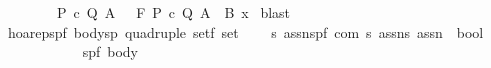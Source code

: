 \begin{isabellebody}
\ \ \ \ \ \ \ \ {\isacharparenleft}{\isasymlambda}{\isacharparenleft}P{\isacharcomma}\ c{\isacharcomma}\ Q{\isacharcomma}\ A{\isacharprime}{\isacharparenright}{\isachardot}\ {\isacharparenleft}{\isasymGamma}{\isacharcomma}\ {\isasymTheta}{\isacharcomma}\ F{\isacharcomma}\ P{\isacharcomma}\ c{\isacharcomma}\ Q{\isacharcomma}\ A{\isacharprime}{\isacharparenright}\ {\isasymin}\ B{\isacharparenright}\ x{\isachardoublequoteclose}\isanewline
%
\isadelimproof
%
\endisadelimproof
%
\isatagproof
{}\isamarkupfalse%
\ blast\isanewline
{}\isamarkupfalse%
%
\endisatagproof
{\isafoldproof}%
%
\isadelimproof
\isanewline
%
\endisadelimproof
\isanewline
\isanewline
{}\isamarkupfalse%
\ {\isachardoublequoteopen}hoarep{\isachardoublequoteclose}{\isacharcolon}{\isacharcolon}{\isachardoublequoteopen}{\isacharbrackleft}{\isacharparenleft}{\isacharprime}s{\isacharcomma}{\isacharprime}p{\isacharcomma}{\isacharprime}f{\isacharparenright}\ body{\isacharcomma}{\isacharparenleft}{\isacharprime}s{\isacharcomma}{\isacharprime}p{\isacharparenright}\ quadruple\ set{\isacharcomma}{\isacharprime}f\ set{\isacharcomma}\isanewline
\ \ \ \ {\isacharprime}s\ assn{\isacharcomma}{\isacharparenleft}{\isacharprime}s{\isacharcomma}{\isacharprime}p{\isacharcomma}{\isacharprime}f{\isacharparenright}\ com{\isacharcomma}\ {\isacharprime}s\ assn{\isacharcomma}{\isacharprime}s\ assn{\isacharbrackright}\ {\isacharequal}{\isachargreater}\ bool{\isachardoublequoteclose}\isanewline
\ \ \ \ {\isacharparenleft}{\isachardoublequoteopen}{\isacharparenleft}{}{\isacharunderscore}{\isacharcomma}{\isacharunderscore}{\isacharslash}{\isasymturnstile}\isactrlbsub {\isacharprime}{\isacharslash}{\isacharunderscore}\ \isactrlesub {\isacharparenleft}{\isacharunderscore}{\isacharslash}\ {\isacharparenleft}{\isacharunderscore}{\isacharparenright}{\isacharslash}\ {\isacharunderscore}{\isacharcomma}{\isacharslash}{\isacharunderscore}{\isacharparenright}{\isacharparenright}{\isachardoublequoteclose}\ {\isacharbrackleft}{}{}{\isacharcomma}{}{}{\isacharcomma}{}{}{\isacharcomma}{}{}{}{}{\isacharcomma}{}{}{\isacharcomma}{}{}{}{}{\isacharcomma}{}{}{}{}{\isacharbrackright}{}{}{\isacharparenright}\isanewline
\ \ \ {\isasymGamma}{\isacharcolon}{\isacharcolon}{\isachardoublequoteopen}{\isacharparenleft}{\isacharprime}s{\isacharcomma}{\isacharprime}p{\isacharcomma}{\isacharprime}f{\isacharparenright}\ body{\isachardoublequoteclose}\isanewline

\end{isabellebody}
